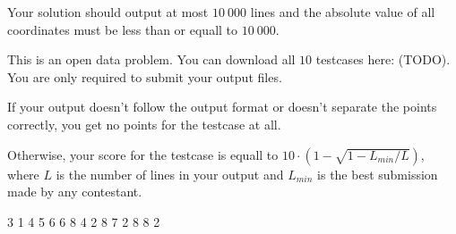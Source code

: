Your solution should output at most $10\ 000$ lines and the absolute value of all coordinates must be less than or equall to $10\ 000$.

This is an open data problem. You can download all $10$ testcases here: (TODO). You are only required to submit your output files.

If your output doesn't follow the output format or doesn't separate the points correctly, you get no points for the testcase at all.

Otherwise, your score for the testcase is equall to
$ 10 \cdot \left(1 - \sqrt{1 - L_{min} / L}\right)$,
where $L$ is the number of lines in your output and $L_{min}$ is the best submission made by any contestant.


3 1
4 5
6 6
8 4
 2 8 7
2 8 8 2
\sampleEND


